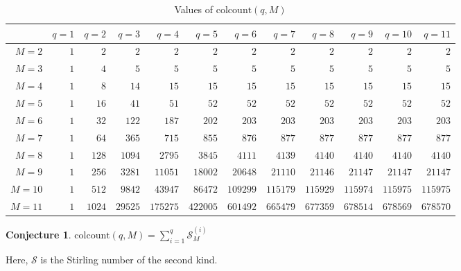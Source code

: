 \documentclass[a4paper]{article}
\newcommand{\colcount}{\mathrm{colcount}}
\newtheorem{conjecture}{Conjecture}
\begin{document}
\begin{table}[h]
\tiny
\centering
\begin{tabular}{|r|rrrrrrrrrrr|}
\hline
       & $q=1$ &  $q=2$ &   $q=3$ &    $q=4$ &    $q=5$ &    $q=6$ &    $q=7$ &    $q=8$ &    $q=9$ &   $q=10$ &   $q=11$ \\
\hline
$M=2$  &   $1$ &    $2$ &     $2$ &      $2$ &      $2$ &      $2$ &      $2$ &      $2$ &      $2$ &      $2$ &      $2$ \\
$M=3$  &   $1$ &    $4$ &     $5$ &      $5$ &      $5$ &      $5$ &      $5$ &      $5$ &      $5$ &      $5$ &      $5$ \\
$M=4$  &   $1$ &    $8$ &    $14$ &     $15$ &     $15$ &     $15$ &     $15$ &     $15$ &     $15$ &     $15$ &     $15$ \\
$M=5$  &   $1$ &   $16$ &    $41$ &     $51$ &     $52$ &     $52$ &     $52$ &     $52$ &     $52$ &     $52$ &     $52$ \\
$M=6$  &   $1$ &   $32$ &   $122$ &    $187$ &    $202$ &    $203$ &    $203$ &    $203$ &    $203$ &    $203$ &    $203$ \\
$M=7$  &   $1$ &   $64$ &   $365$ &    $715$ &    $855$ &    $876$ &    $877$ &    $877$ &    $877$ &    $877$ &    $877$ \\
$M=8$  &   $1$ &  $128$ &  $1094$ &   $2795$ &   $3845$ &   $4111$ &   $4139$ &   $4140$ &   $4140$ &   $4140$ &   $4140$ \\
$M=9$  &   $1$ &  $256$ &  $3281$ &  $11051$ &  $18002$ &  $20648$ &  $21110$ &  $21146$ &  $21147$ &  $21147$ &  $21147$ \\
$M=10$ &   $1$ &  $512$ &  $9842$ &  $43947$ &  $86472$ & $109299$ & $115179$ & $115929$ & $115974$ & $115975$ & $115975$ \\
$M=11$ &   $1$ & $1024$ & $29525$ & $175275$ & $422005$ & $601492$ & $665479$ & $677359$ & $678514$ & $678569$ & $678570$ \\
\hline
\end{tabular}
\caption{Values of $\colcount(q,M)$}
\label{table:colcount-values}
\end{table}

\begin{conjecture}
$\colcount(q,M)=\sum_{i=1}^{q} \mathcal{S}_M^{(i)}$
\end{conjecture}

Here, $\mathcal{S}$ is the Stirling number of the second kind.
\end{document}
